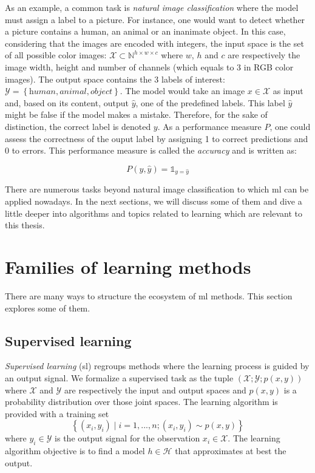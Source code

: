 As an example, a common task is \textit{natural image classification} where the model must assign a label to a picture. For instance, one would want to detect whether a picture contains a human, an animal or an inanimate object. In this case, considering that the images are encoded with integers, the input space is the set of all possible color images: $\mathcal{X} \subset \mathbb{N}^{h\times w\times c}$ where $w$, $h$ and $c$ are respectively the image width, height and number of channels (which equals to 3 in RGB color images). The output space contains the 3 labels of interest: $\mathcal{Y} = \left\{\textit{human}, \textit{animal}, \textit{object}\right\}$. The model would take an image $x \in \mathcal{X}$ as input and, based on its content, output $\hat{y}$, one of the predefined labels. This label $\hat{y}$ might be false if the model makes a mistake. Therefore, for the sake of distinction, the correct label is denoted $y$. As a performance measure $P$, one could assess the correctness of the ouput label by assigning 1 to correct predictions and 0 to errors. This performance measure is called the \textit{accuracy} and is written as: 

\begin{equation}
P(y, \hat{y}) = \mathbb{1}_{y=\hat{y}}
\end{equation}

There are numerous tasks beyond natural image classification to which \acrlong{ml} can be applied nowadays. In the next sections, we will discuss some of them and dive a little deeper into algorithms and topics related to learning which are relevant to this thesis.


\section{Families of learning methods}
\label{sec:backml:families}

There are many ways to structure the ecosystem of \acrlong{ml} methods. This section explores some of them.

\subsection{Supervised learning}
\label{ssec:backml:sl}

\textit{Supervised learning} (\acrshort{sl}) regroups methods where the learning process is guided by an output signal. We formalize a supervised task as the tuple $\left(\mathcal{X}; \mathcal{Y}; p(x, y)\right)$ where $\mathcal{X}$ and $\mathcal{Y}$ are respectively the input and output spaces and $p(x, y)$ is a probability distribution over those joint spaces. The learning algorithm is provided with a training set 
\begin{equation}
\label{eqn:backml:supervised}
\left\{(x_i, y_i) \mid i = 1,...,n ; (x_i, y_i) \sim p(x, y) \right\}
\end{equation}
where $y_i \in \mathcal{Y}$ is the output signal for the observation $x_i \in \mathcal{X}$. The learning algorithm objective is to find a model $h \in \mathcal{H}$ that approximates at best the output. 

